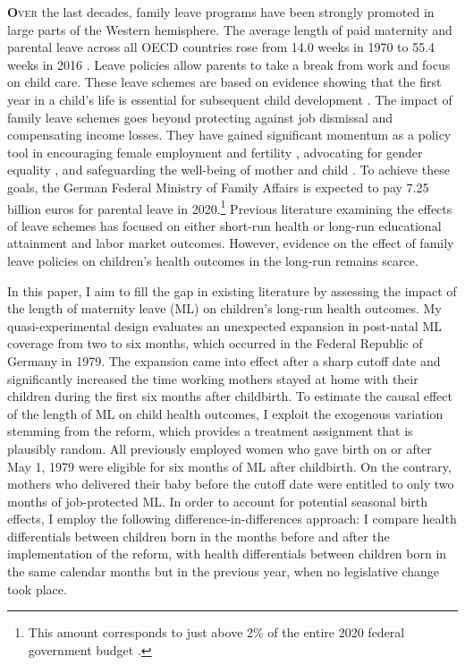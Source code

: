 

\lettrine[lines=2,nindent=0pt]{\color{darkgray}\textbf{O}}{ver} the last decades, family leave programs have been strongly promoted in large parts of the Western hemisphere. The average length of paid maternity and parental leave across all OECD countries rose from 14.0 weeks in 1970 to 55.4 weeks in 2016 \citep{oecd_data_leave}. Leave policies allow parents to take a break from work and focus on child care. These leave schemes are based on evidence showing that the first year in a child's life is essential for subsequent child development \citep{currie2011human}. The impact of family leave schemes goes beyond protecting against job dismissal and compensating income losses. They have gained significant momentum as a policy tool in encouraging female employment \citep{blau2013} and fertility \citep{RafaelLaliveandJosefZweimuller2009}, advocating for gender equality \citep{kotsadam2011state}, and safeguarding the well-being of mother and child \citep{butikofer2018impact}. To achieve these goals, the German Federal Ministry of Family Affairs is expected to pay 7.25 billion euros for parental leave in 2020.\footnote{This amount corresponds to just above 2\% of the entire 2020 federal government budget \citep{federal_budget}.} Previous literature examining the effects of leave schemes has focused on either short-run health or long-run educational attainment and labor market outcomes. However, evidence on the effect of family leave policies on children's health outcomes in the long-run remains scarce.


In this paper, I aim to fill the gap in existing literature by assessing the impact of the length of maternity leave (ML) on children’s long-run health outcomes. My quasi-experimental design evaluates an unexpected expansion in post-natal ML coverage from two to six months, which occurred in the Federal Republic of Germany in 1979. The expansion came into effect after a sharp cutoff date and significantly increased the time working mothers stayed at home with their children during the first six months after childbirth. To estimate the causal effect of the length of ML on child health outcomes, I exploit the exogenous variation stemming from the reform, which provides a treatment assignment that is plausibly random. All previously employed women who gave birth on or after May 1, 1979 were eligible for six months of ML after childbirth. On the contrary, mothers who delivered their baby before the cutoff date were entitled to only two months of job-protected ML. In order to account for potential seasonal birth effects, I employ the following difference-in-differences approach: I compare health differentials between children born in the months before and after the implementation of the reform, with health differentials between children born in the same calendar months but in the previous year, when no legislative change took place.


